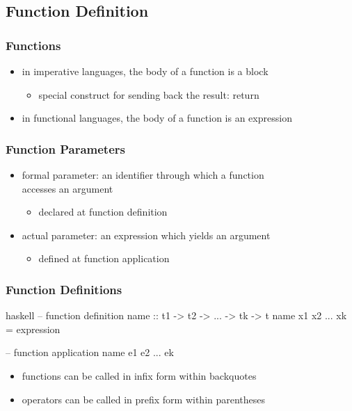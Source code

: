 \documentclass[dvipsnames]{beamer}
\theoremstyle{plain}
\begin{document}
\subsection{Function Definition}

\begin{frame}
  \frametitle{Functions}

  \begin{itemize}
    \item in imperative languages, the body of a function is a block
    \begin{itemize}
      \item special construct for sending back the result: \alert{return}
    \end{itemize}

    \pause
    \bigskip
    \item in functional languages, the body of a function is an expression
  \end{itemize}
\end{frame}

\begin{frame}
  \frametitle{Function Parameters}

  \begin{itemize}
    \item \alert{formal parameter}: an identifier through which a function\\
      accesses an argument
    \begin{itemize}
      \item declared at function definition
    \end{itemize}

    \pause
    \medskip
    \item \alert{actual parameter}: an expression which yields an argument
    \begin{itemize}
      \item defined at function application
    \end{itemize}
  \end{itemize}
\end{frame}

\begin{frame}[fragile]
  \frametitle{Function Definitions}

  \begin{block}{}
    \begin{pygments}{haskell}
-- function definition
name :: t1 -> t2 -> ... -> tk -> t
name x1 x2 ... xk = expression

-- function application
name e1 e2 ... ek
    \end{pygments}
  \end{block}

  \begin{itemize}
    \item functions can be called in infix form within backquotes
    \item operators can be called in prefix form within parentheses
  \end{itemize}
\end{frame}
\end{document}
